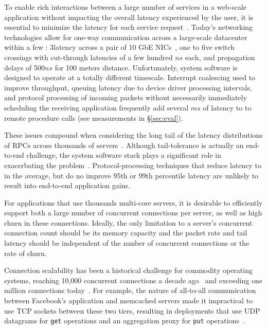  To enable rich interactions between a
large number of services in a web-scale application without impacting
the overall latency experienced by the user, it is essential to
minimize the latency for each service
request~\cite{luiz-isscc,rumble2011s}. Today's networking
technologies allow for one-way communication across a large-scale
datacenter within a few \microsecond : 3\microsecond latency across
a pair of 10 GbE NICs~\cite{cisco-sereno}, one to five switch
crossings with cut-through latencies of a few hundred $ns$ each, and
propagation delays of 500$ns$ for 100 meters distance. Unfortunately,
system software is designed to operate at a totally different
timescale. Interrupt coalescing used to improve throughput, queuing
latency due to device driver processing intervals, and protocol
processing of incoming packets without necessarily immediately
scheduling the receiving application frequently add several $ms$ of
latency to to remote procedure calls (see measurements in \S\ref{sec:eval}).


These issues compound when considering the long tail of the latency
distributions of RPCs across thousands of
servers~\cite{DBLP:journals/cacm/DeanB13}. Although tail-tolerance is
actually an end-to-end challenge, the system software stack plays a
significant role in exacerbating the problem~\cite{Leverich:RHSU:2014}.
Protocol-processing techniques that reduce latency to \microsecond in
the average, but do no improve 95th or 99th percentile latency are
unlikely to result into end-to-end application gains.

 For applications that use thousands
multi-core servers, it is desirable to efficiently support both a
large number of concurrent connections per server, as well as high
churn in these connections.  Ideally, the only limitation to a
server's concurrent connection count should be its memory capacity and
the packet rate and tail latency should be independent of the nunber
of concurrent connections or the rate of churn.
 
Connection scalability has been a historical challenge for commodity
operating systems, reaching 10,000 concurrent connections a decade
ago~\cite{theC10Kproblem} and exceeding one million connections
today~\cite{theC10Mproblem}. For example, the nature of all-to-all
communication between Facebook's application and memcached servers
made it impractical to use TCP sockets between these two tiers,
resulting in deployments that use UDP datagrams for \texttt{get}
operations and an aggregation proxy for \texttt{put}
operations~\cite{nishtala2013scaling}.

